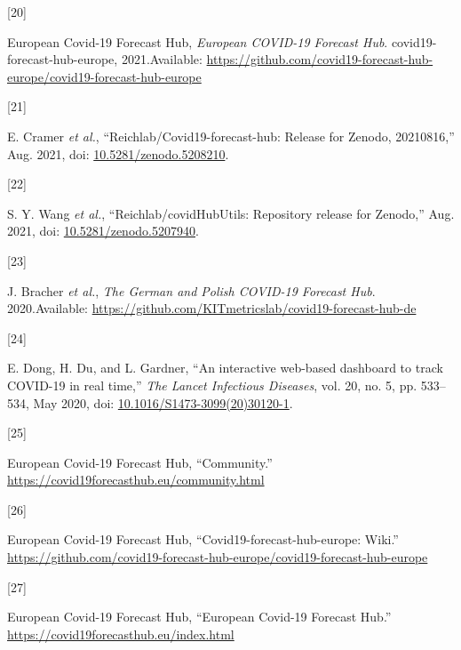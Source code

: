 \documentclass[
]{article}
\newlength{\cslhangindent}
\newlength{\csllabelwidth}
\newlength{\cslentryspacingunit} %
\newenvironment{CSLReferences}[2] %
 {%
  \setlength{\parindent}{0pt}
  \ifodd #1
  \let\oldpar\par
  \def\par{\hangindent=\cslhangindent\oldpar}
  \fi
  \setlength{\parskip}{#2\cslentryspacingunit}
 }%
 {}
\newcommand{\CSLLeftMargin}[1]{\parbox[t]{\csllabelwidth}{#1}}
\newcommand{\CSLRightInline}[1]{\parbox[t]{\linewidth - \csllabelwidth}{#1}\break}
\begin{document}
\begin{CSLReferences}{0}{0}
\leavevmode{}%
\CSLLeftMargin{{[}20{]} }
\CSLRightInline{European Covid-19 Forecast Hub, \emph{European {COVID-19 Forecast Hub}}. {covid19-forecast-hub-europe}, 2021.Available: \url{https://github.com/covid19-forecast-hub-europe/covid19-forecast-hub-europe}}

\leavevmode{}%
\CSLLeftMargin{{[}21{]} }
\CSLRightInline{E. Cramer \emph{et al.}, {``Reichlab/Covid19-forecast-hub: Release for {Zenodo}, 20210816,''} Aug. 2021, doi: \href{https://doi.org/10.5281/zenodo.5208210}{10.5281/zenodo.5208210}.}

\leavevmode{}%
\CSLLeftMargin{{[}22{]} }
\CSLRightInline{S. Y. Wang \emph{et al.}, {``Reichlab/{covidHubUtils}: Repository release for {Zenodo},''} Aug. 2021, doi: \href{https://doi.org/10.5281/zenodo.5207940}{10.5281/zenodo.5207940}.}

\leavevmode{}%
\CSLLeftMargin{{[}23{]} }
\CSLRightInline{J. Bracher \emph{et al.}, \emph{The {German} and {Polish COVID-19 Forecast Hub}}. 2020.Available: \url{https://github.com/KITmetricslab/covid19-forecast-hub-de}}

\leavevmode{}%
\CSLLeftMargin{{[}24{]} }
\CSLRightInline{E. Dong, H. Du, and L. Gardner, {``An interactive web-based dashboard to track {COVID-19} in real time,''} \emph{The Lancet Infectious Diseases}, vol. 20, no. 5, pp. 533--534, May 2020, doi: \href{https://doi.org/10.1016/S1473-3099(20)30120-1}{10.1016/S1473-3099(20)30120-1}.}

\leavevmode{}%
\CSLLeftMargin{{[}25{]} }
\CSLRightInline{European Covid-19 Forecast Hub, {``Community.''} \url{https://covid19forecasthub.eu/community.html}}

\leavevmode{}%
\CSLLeftMargin{{[}26{]} }
\CSLRightInline{European Covid-19 Forecast Hub, {``Covid19-forecast-hub-europe: {Wiki}.''} \url{https://github.com/covid19-forecast-hub-europe/covid19-forecast-hub-europe}}

\leavevmode{}%
\CSLLeftMargin{{[}27{]} }
\CSLRightInline{European Covid-19 Forecast Hub, {``European {Covid-19 Forecast Hub}.''} \url{https://covid19forecasthub.eu/index.html}}


\end{CSLReferences}
\end{document}
